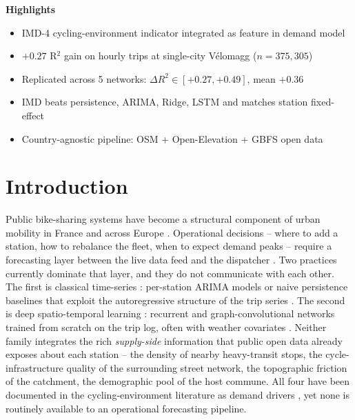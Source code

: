 \documentclass[11pt,a4paper]{article}
\newenvironment{highlights}{%
  \par\noindent\textbf{\large Highlights}\par\smallskip
  \begin{itemize}[leftmargin=1.4em,itemsep=0.15em,topsep=0.2em]}{%
  \end{itemize}\par\medskip}
\begin{document}
\begin{highlights}
\item IMD-4 cycling-environment indicator integrated as feature in demand model
\item $+0.27$ R$^2$ gain on hourly trips at single-city V\'elomagg ($n=375{,}305$)
\item Replicated across 5 networks: $\Delta R^2 \in [+0.27, +0.49]$, mean $+0.36$
\item IMD beats persistence, ARIMA, Ridge, LSTM and matches station fixed-effect
\item Country-agnostic pipeline: OSM + Open-Elevation + GBFS open data
\end{highlights}

\section{Introduction}
\label{sec:intro}

Public bike-sharing systems have become a structural component of
urban mobility in France and across Europe \citep{Pucher2010,Buehler2012}.
Operational decisions -- where to add a station, how to rebalance
the fleet, when to expect demand peaks -- require a forecasting
layer between the live data feed and the dispatcher
\citep{Forma2015,Raviv2013}.  Two practices currently dominate
that layer, and they do not communicate with each other.  The
first is classical time-series : per-station ARIMA models or naive
persistence baselines that exploit the autoregressive structure of
the trip series \citep{Box1976,Hyndman2008}.  The second is deep
spatio-temporal learning : recurrent and graph-convolutional
networks trained from scratch on the trip log, often with weather
covariates \citep{Lin2018,Wang2021}.  Neither family integrates
the rich \emph{supply-side} information that public open data
already exposes about each station -- the density of nearby
heavy-transit stops, the cycle-infrastructure quality of the
surrounding street network, the topographic friction of the
catchment, the demographic pool of the host commune.  All four
have been documented in the cycling-environment literature as
demand drivers
\citep{Heinen2010,Schoner2014,Parkin2008,Rietveld2004,FaghihImani2014},
yet none is routinely available to an operational forecasting
pipeline.
\end{document}
